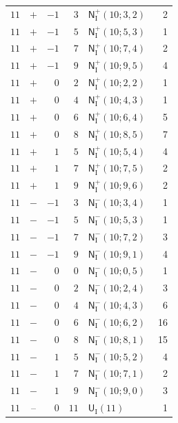 \documentclass[10pt]{article}
\begin{document}
\begin{longtable}{@{}r c r r >{\RaggedRight\arraybackslash}p{0.48\linewidth} r@{}}
$11$ & $+$ & $-1$ & $3$ & $\mathsf N_{\mathrm I}^{+}(10;3,2)$ & 2 \\
$11$ & $+$ & $-1$ & $5$ & $\mathsf N_{\mathrm I}^{+}(10;5,3)$ & 1 \\
$11$ & $+$ & $-1$ & $7$ & $\mathsf N_{\mathrm I}^{+}(10;7,4)$ & 2 \\
$11$ & $+$ & $-1$ & $9$ & $\mathsf N_{\mathrm I}^{+}(10;9,5)$ & 4 \\
$11$ & $+$ & $0$ & $2$ & $\mathsf N_{\mathrm I}^{+}(10;2,2)$ & 1 \\
$11$ & $+$ & $0$ & $4$ & $\mathsf N_{\mathrm I}^{+}(10;4,3)$ & 1 \\
$11$ & $+$ & $0$ & $6$ & $\mathsf N_{\mathrm I}^{+}(10;6,4)$ & 5 \\
$11$ & $+$ & $0$ & $8$ & $\mathsf N_{\mathrm I}^{+}(10;8,5)$ & 7 \\
$11$ & $+$ & $1$ & $5$ & $\mathsf N_{\mathrm I}^{+}(10;5,4)$ & 4 \\
$11$ & $+$ & $1$ & $7$ & $\mathsf N_{\mathrm I}^{+}(10;7,5)$ & 2 \\
$11$ & $+$ & $1$ & $9$ & $\mathsf N_{\mathrm I}^{+}(10;9,6)$ & 2 \\
$11$ & $-$ & $-1$ & $3$ & $\mathsf N_{\mathrm I}^{-}(10;3,4)$ & 1 \\
$11$ & $-$ & $-1$ & $5$ & $\mathsf N_{\mathrm I}^{-}(10;5,3)$ & 1 \\
$11$ & $-$ & $-1$ & $7$ & $\mathsf N_{\mathrm I}^{-}(10;7,2)$ & 3 \\
$11$ & $-$ & $-1$ & $9$ & $\mathsf N_{\mathrm I}^{-}(10;9,1)$ & 4 \\
$11$ & $-$ & $0$ & $0$ & $\mathsf N_{\mathrm I}^{-}(10;0,5)$ & 1 \\
$11$ & $-$ & $0$ & $2$ & $\mathsf N_{\mathrm I}^{-}(10;2,4)$ & 3 \\
$11$ & $-$ & $0$ & $4$ & $\mathsf N_{\mathrm I}^{-}(10;4,3)$ & 6 \\
$11$ & $-$ & $0$ & $6$ & $\mathsf N_{\mathrm I}^{-}(10;6,2)$ & 16 \\
$11$ & $-$ & $0$ & $8$ & $\mathsf N_{\mathrm I}^{-}(10;8,1)$ & 15 \\
$11$ & $-$ & $1$ & $5$ & $\mathsf N_{\mathrm I}^{-}(10;5,2)$ & 4 \\
$11$ & $-$ & $1$ & $7$ & $\mathsf N_{\mathrm I}^{-}(10;7,1)$ & 2 \\
$11$ & $-$ & $1$ & $9$ & $\mathsf N_{\mathrm I}^{-}(10;9,0)$ & 3 \\
$11$ & $\text{--}$ & $0$ & $11$ & $\mathsf U_{\mathrm I}(11)$ & 1 \\

\end{longtable}
\end{document}
